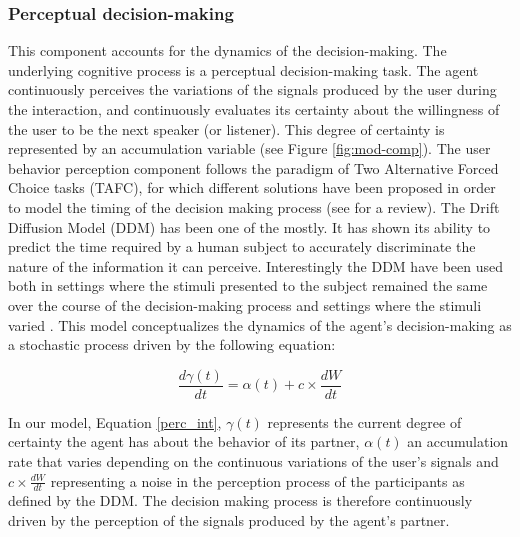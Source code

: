 
\subsubsection{Perceptual decision-making}

This component accounts for the dynamics of the decision-making. The underlying cognitive process is a perceptual decision-making task. The agent continuously perceives the variations of the signals produced by the user during the interaction, and continuously evaluates its certainty about the willingness of the user to be the next speaker (or listener). This degree of certainty is represented by an accumulation variable (see Figure \ref{fig:mod-comp}).
The user behavior perception component follows the paradigm of Two Alternative Forced Choice tasks (TAFC), for which different solutions have been proposed in order to model the timing of the decision making process (see \citep{bogacz_physics_2006} for a review). 
The Drift Diffusion Model (DDM) has been one of the mostly. It has shown its ability to predict the time required by a human subject to accurately discriminate the nature of the information it can perceive. 
Interestingly the DDM have been used both in settings where the stimuli presented to the subject remained the same over the course of the decision-making process and settings where the stimuli varied \cite{ratcliff_note_1980}. This model conceptualizes the dynamics of the agent's decision-making as a stochastic process driven by the following equation:

\begin{equation}
  \frac{d\gamma(t)}{dt}=\alpha(t)+c\times\frac{dW}{dt}
  \label{perc_int}
\end{equation}

In our model, Equation \ref{perc_int}, $\gamma(t)$ represents the current degree of certainty the agent has about the behavior of its partner, $\alpha(t)$ an accumulation rate that varies depending on the continuous variations of the user's signals and $c\times\frac{dW}{dt}$ representing a noise in the perception process of the participants as defined by the DDM. The decision making process is therefore continuously driven by the perception of the signals produced by the agent's partner.

